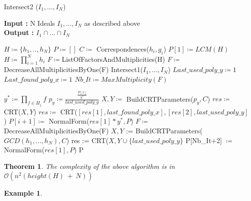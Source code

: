 \documentclass{article}
\newtheorem{theorem}{Theorem}[section]
\newtheorem{example}{Example}[section]
\begin{document}
\begin{algorithm}
    \caption{Intersect2 ($I_{1},\dots,I_{N}$)}\label{alg:intersect-2-ideals-diff-gcd}
    \textbf{Input : } N Ideals $I_{1},\dots,I_{N}$ as described above \\
    \textbf{Output : }$I_{1} \cap \dots\cap I_ {N}$
\begin{algorithmic}
    \State $H \coloneqq \{h_{1},..,h_{N}\}$
    \State $P \coloneqq []$
    \State $C \coloneqq $ Correspondences($h_{i},g_{i}$) 
    \State $P[1] \coloneqq LCM(H)$
    \State $H \coloneqq \prod^{N}_{i=1} h_{i}$
    \State $F \coloneqq $ListOfFactorsAndMultiplicities(H)
    \State $F \coloneqq $DecreaseAllMultiplicitiesByOne(F)
        \State \Return Intersect1($I_{1},\dots,I_{N}$)
    \EndIf
    \State $Last\_used\_poly\_y \coloneqq 1$
    \State $Last\_found\_poly\_x \coloneqq 1$
    \State $Nb\_It \coloneqq MaxMultiplicity(F) $ 

        \State $y^{*}\coloneqq \prod_{f \in H_{j}} f$ 
        \State $p_y\coloneqq \frac{\frac{P[1]}{y^{*}}}{last\_used\_poly\_y}$ 
        \State $X, Y\coloneqq$ BuildCRTParameters($p_y, C$)
        \State $res \coloneqq $ CRT($X,Y$)
            \State $res \coloneqq $ CRT($[res[1],last\_found\_poly\_x],[res[2],last\_used\_poly\_y]$)
        \EndIf
        \State $P[i+1] \coloneqq $ NormalForm($res[1]*y^{*},P$)
        \State $F \coloneqq $ DecreaseAllMultiplicitiesByOne(F)
    \EndFor
    \State $X,Y$ := BuildCRTParameters($GCD(h_{1},\dots,h_{N}),C$)
    \State res := CRT($X,Y\cup\{last\_used\_poly\_y\}$
    \State P[Nb\_It+2] $\coloneqq $NormalForm($res[1],P$)
    \State \Return P

\end{algorithmic}
\end{algorithm}

\begin{theorem} The complexity of the above algorithm is in $\mathcal{O}(n^{2}(height(H)\ +\ N))$
\end{theorem}



\begin {example}

\end{example}


\nocite{*}
\printbibliography
\end{document}
